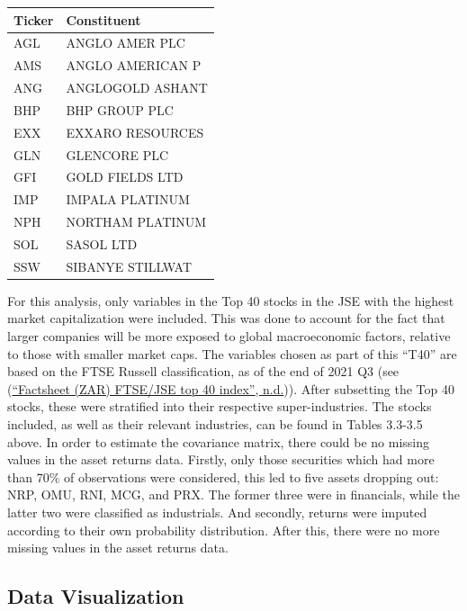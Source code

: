 \documentclass[11pt,preprint, authoryear]{elsarticle}
\let\origtable\table
\let\endorigtable\endtable
\renewenvironment{table}[1][2] {
    \expandafter\origtable\expandafter[H]
} {
    \endorigtable
}
\numberwithin{equation}{section}
\numberwithin{figure}{section}
\numberwithin{table}{section}
\begin{document}
\begin{table}[H]

\caption{\label{tab:unnamed-chunk-2}T40 Constituents: Resources}
\centering
\begin{tabular}[t]{l|l}
\hline
Ticker & Constituent\\
\hline
AGL & ANGLO AMER PLC\\
\hline
AMS & ANGLO AMERICAN P\\
\hline
ANG & ANGLOGOLD ASHANT\\
\hline
BHP & BHP GROUP PLC\\
\hline
EXX & EXXARO RESOURCES\\
\hline
GLN & GLENCORE PLC\\
\hline
GFI & GOLD FIELDS LTD\\
\hline
IMP & IMPALA PLATINUM\\
\hline
NPH & NORTHAM PLATINUM\\
\hline
SOL & SASOL LTD\\
\hline
SSW & SIBANYE STILLWAT\\
\hline
\end{tabular}
\end{table}

For this analysis, only variables in the Top 40 stocks in the JSE with
the highest market capitalization were included. This was done to
account for the fact that larger companies will be more exposed to
global macroeconomic factors, relative to those with smaller market
caps. The variables chosen as part of this ``T40'' are based on the FTSE
Russell classification, as of the end of 2021 Q3 (see
(\protect\hyperlink{ref-FTSE}{{``Factsheet (ZAR) FTSE/JSE top 40
index''}, n.d.})). After subsetting the Top 40 stocks, these were
stratified into their respective super-industries. The stocks included,
as well as their relevant industries, can be found in Tables 3.3-3.5
above. In order to estimate the covariance matrix, there could be no
missing values in the asset returns data. Firstly, only those securities
which had more than 70\% of observations were considered, this led to
five assets dropping out: NRP, OMU, RNI, MCG, and PRX. The former three
were in financials, while the latter two were classified as industrials.
And secondly, returns were imputed according to their own probability
distribution. After this, there were no more missing values in the asset
returns data.

\hypertarget{data-visualization}{%
\subsection{Data Visualization}\label{data-visualization}}
\end{document}
